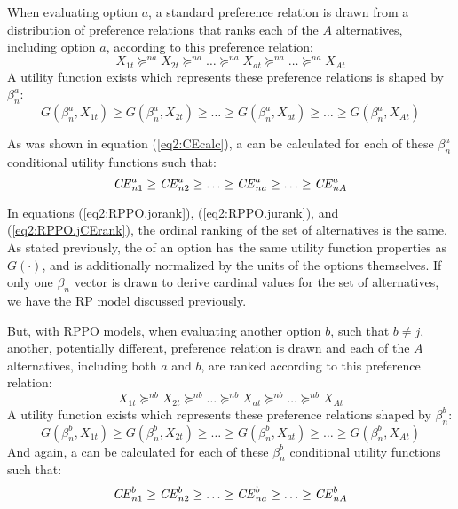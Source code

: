\documentclass[../main.tex]{subfiles}
\begin{document}
When evaluating option $a$, a standard preference relation is drawn from a distribution of preference relations that ranks each of the $A$ alternatives, including option $a$, according to this preference relation:
\begin{equation}
	\label{eq2:RPPO.jorank}
	X_{1t} \succcurlyeq^{na} X_{2t} \succcurlyeq^{na} \ldots \succcurlyeq^{na} X_{at} \succcurlyeq^{na} \ldots \succcurlyeq^{na} X_{At}
\end{equation}
\noindent A utility function exists which represents these preference relations is shaped by $\beta_n^a$:
\begin{equation}
	\label{eq2:RPPO.jurank}
	G(\beta_n^a,X_{1t}) \geq G(\beta_n^a,X_{2t}) \geq \ldots \geq G(\beta_n^a,X_{at}) \geq \ldots \geq G(\beta_n^a,X_{At})
\end{equation}

As was shown in equation (\ref{eq2:CEcalc}), a {\CE} can be calculated for each of these $\beta_n^a$ conditional utility functions such that:
\begin{equation}
	\label{eq2:RPPO.jCErank}
	{\ensuremath{\mathit{CE}}}^a_{n1} \geq {\ensuremath{\mathit{CE}}}^a_{n2} \geq \ldots \geq {\ensuremath{\mathit{CE}}}^a_{na} \geq \ldots \geq {\ensuremath{\mathit{CE}}}^a_{nA}
\end{equation}

In equations (\ref{eq2:RPPO.jorank}), (\ref{eq2:RPPO.jurank}), and (\ref{eq2:RPPO.jCErank}), the ordinal ranking of the set of alternatives is the same.
As stated previously, the {\CE} of an option has the same utility function properties as $G(\cdot)$, and is additionally normalized by the units of the options themselves.
If only one $\beta_n$ vector is drawn to derive cardinal values for the set of alternatives, we have the RP model discussed previously.

But, with RPPO models, when evaluating another option $b$, such that $b \neq j$, another, potentially different, preference relation is drawn and each of the $A$ alternatives, including both $a$ and $b$, are ranked according to this preference relation:
\begin{equation}
	\label{eq2:RPPO.korank}
	X_{1t} \succcurlyeq^{nb} X_{2t} \succcurlyeq^{nb} \ldots \succcurlyeq^{nb} X_{at} \succcurlyeq^{nb} \ldots \succcurlyeq^{nb} X_{At}
\end{equation}
\noindent A utility function exists which represents these preference relations shaped by $\beta_n^b$:
\begin{equation}
	\label{eq2:RPPO.kurank}
	G(\beta_n^b,X_{1t}) \geq G(\beta_n^b,X_{2t}) \geq \ldots \geq G(\beta_n^b,X_{at}) \geq \ldots \geq G(\beta_n^b,X_{At})
\end{equation}
\noindent And again, a {\CE} can be calculated for each of these $\beta_n^b$ conditional utility functions such that:
\begin{equation}
	\label{eq2:RPPO.kCErank}
	{\ensuremath{\mathit{CE}}}^b_{n1} \geq {\ensuremath{\mathit{CE}}}^b_{n2} \geq \ldots \geq {\ensuremath{\mathit{CE}}}^b_{na} \geq \ldots \geq {\ensuremath{\mathit{CE}}}^b_{nA}
\end{equation}
\end{document}
